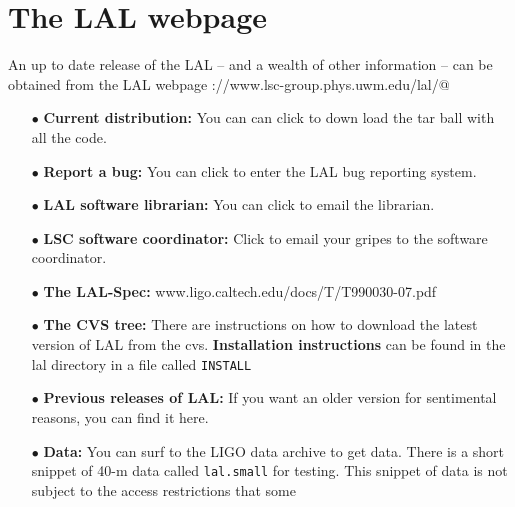 \documentclass[oneside]{book}
\begin{document}
\section{The LAL webpage}

An up to date release  of the LAL -- and a wealth of other information
-- can be obtained from the LAL webpage
\verb@http://www.lsc-group.phys.uwm.edu/lal/@

\begin{itemize}
   \vspace*{-0.1in}
    \item[$\bullet$ ]  {\bf Current distribution:} You can can click
                       to down load the tar ball with all the code.
    \vspace*{-0.051in}
    \item[$\bullet$ ] {\bf Report a bug:}  You can click to enter
                      the LAL bug reporting system.
    \vspace*{-0.051in}
    \item[$\bullet$ ] {\bf LAL software librarian:}  You can click to
                      email the librarian.
    \vspace*{-0.051in}
    \item[$\bullet$ ] {\bf LSC software coordinator:} Click
                      to email your gripes to the software coordinator.
    \vspace*{-0.051in}
    \item[$\bullet$ ] {\bf The LAL-Spec:}
                      www.ligo.caltech.edu/docs/T/T990030-07.pdf
    \vspace*{-0.051in}
    \item[$\bullet$ ] {\bf The CVS tree:}  There are instructions
                      on how to download the latest version of
                      LAL from the cvs. {\bf Installation
                      instructions} can be found in the lal
                      directory in a file called {\tt INSTALL}
    \vspace*{-0.051in}
    \item[$\bullet$]  {\bf Previous releases of LAL:} If you want an older
                      version for sentimental reasons, you can find it here.
    \vspace*{-0.051in}
    \item[$\bullet$ ] {\bf Data:}  You can surf to the LIGO data archive to get
                      data.  There is a short snippet of 40-m data called
                      {\tt lal.small} for testing.  This snippet of data
                      is not subject to the access restrictions that some

\end{itemize}
\end{document}
